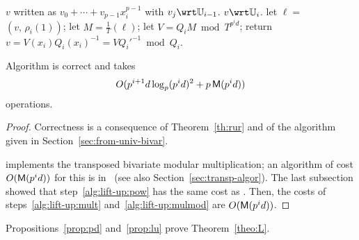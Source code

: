 \begin{algorithm}
  \caption{}
  \label{alg:liftup}
  \begin{algorithmic}[1]
    \REQUIRE $v$ written as $v_0+\cdots+v_{p-1}x_i^{p-1}$ with $v_j \wrt \U_{i-1}$.
    \ENSURE $v\wrt \U_i$.
    \STATE \label{alg:lift-up:transmul} let $\ell =$ $(v,\,\rho_i(1))$;
    \STATE \label{alg:lift-up:pow} let $M=\frac{1}{T}$$(\ell)$;
    \STATE \label{alg:lift-up:mult} let $V = Q_iM \bmod T^{p^id}$;
    \STATE \label{alg:lift-up:mulmod} return $v=V(x_i)Q_i(x_i)^{-1} = V {Q_i'}^{-1} \bmod Q_i$.
  \end{algorithmic}
\end{algorithm}

\begin{proposition}\label{prop:lu}
  Algorithm  is correct and takes 
  \begin{equation}
    \label{eq:85}
    O(p^{i+1}d\log_p(p^id)^2+p\,\mathsf{M}(p^{i}d))
  \end{equation}
  operations.
\end{proposition}
\begin{proof}
  Correctness is a consequence of Theorem~\ref{th:rur} and of the
  algorithm given in Section~\ref{sec:from-univ-bivar}.

   implements the
  transposed bivariate
  modular multiplication; an algorithm of cost $O(\mathsf{M}(p^id))$ for
  this is in~\cite[Corollary~2]{pascal+schost06} (see also
  Section~\ref{sec:transp-algor}).  The last subsection showed that
  step~\ref{alg:lift-up:pow} has the same cost as
  . Then, the costs of
  steps~\ref{alg:lift-up:mult} and~\ref{alg:lift-up:mulmod} are
  $O(\mathsf{M}(p^id))$.
\end{proof}

Propositions~\ref{prop:pd} and~\ref{prop:lu} prove
Theorem~\ref{theo:L}.


